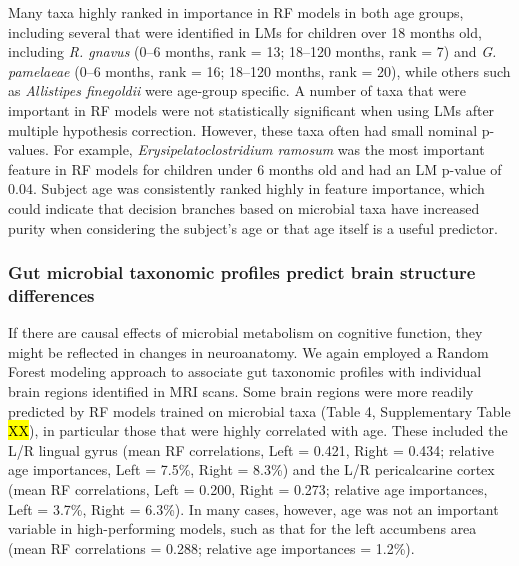 \documentclass{article}
\begin{document}
Many taxa highly ranked in importance in RF models in both age
groups, including several that were identified in LMs for children over
18 months old, including \emph{R. gnavus} (0--6 months, rank = 13;
18--120 months, rank = 7) and \emph{G. pamelaeae} (0--6 months, rank =
16; 18--120 months, rank = 20), while others such as \emph{Allistipes
finegoldii} were age-group specific. A number of taxa that were important in RF models
were not statistically significant when using LMs after
multiple hypothesis correction. However, these taxa often had small nominal
p-values. For example, \emph{Erysipelatoclostridium ramosum} was the
most important feature in RF models for children under 6 months old and
had an LM p-value of 0.04. Subject age was consistently ranked highly in
feature importance, which could indicate that decision branches based on
microbial taxa have increased purity when considering the subject's age
or that age itself is a useful predictor.

\subsubsection*{Gut microbial taxonomic profiles predict brain structure differences}

If there are causal effects of microbial metabolism on cognitive
function, they might be reflected in changes in neuroanatomy. We again
employed a Random Forest modeling approach to associate gut taxonomic
profiles with individual brain regions identified in MRI scans.
Some brain regions were more readily
predicted by RF models trained on microbial taxa (Table 4, Supplementary
Table \hl{XX}), in particular those that were highly correlated with age.
These included the L/R lingual gyrus (mean RF correlations, Left =
0.421, Right = 0.434; relative age importances, Left = 7.5\%, Right =
8.3\%) and the L/R pericalcarine cortex (mean RF correlations, Left =
0.200, Right = 0.273; relative age importances, Left = 3.7\%, Right =
6.3\%). In many cases, however, age was not an important variable in
high-performing models, such as that for the left accumbens area (mean
RF correlations = 0.288; relative age importances = 1.2\%).
\end{document}
